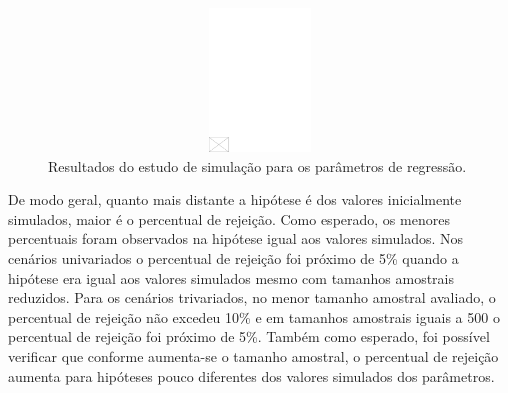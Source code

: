 \documentclass[AMA,STIX1COL]{WileyNJD-v2}
\begin{document}
\begin{figure}[h]
\centerline{\includegraphics[width=342pt,height=9pc,draft]{empty}}
\caption{Resultados do estudo de simulação para os parâmetros de regressão.\label{fig2}}
\end{figure}

De modo geral, quanto mais distante a hipótese é dos valores inicialmente simulados, maior é o percentual de rejeição. Como esperado, os menores percentuais foram observados na hipótese igual aos valores simulados. Nos cenários univariados o percentual de rejeição foi próximo de 5\% quando a hipótese era igual aos valores simulados mesmo com tamanhos amostrais reduzidos. Para os cenários trivariados, no menor tamanho amostral avaliado, o percentual de rejeição não excedeu 10\% e em tamanhos amostrais iguais a 500 o percentual de rejeição foi próximo de 5\%. Também como esperado, foi possível verificar que conforme aumenta-se o tamanho amostral, o percentual de rejeição aumenta para hipóteses pouco diferentes dos valores simulados dos parâmetros.
\end{document}
